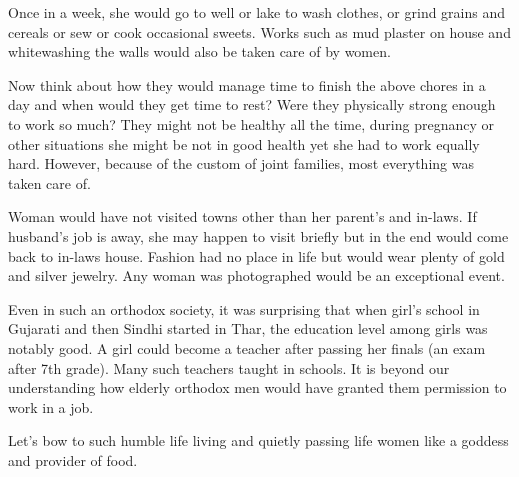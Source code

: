 Once in a week, she would go to well or lake to wash clothes, or grind grains
and cereals or sew or cook occasional sweets. Works such as mud plaster on
house and whitewashing the walls would also be taken care of by women.

Now think about how they would manage time to finish the above chores in a day
and when would they get time to rest? Were they physically strong enough to
work so much? They might not be healthy all the time, during pregnancy or other
situations she might be not in good health yet she had to work equally hard.
However, because of the custom of joint families, most everything was taken
care of.

Woman would have not visited towns other than her parent's and in-laws. If
husband's job is away, she may happen to visit briefly but in the end would
come back to in-laws house. Fashion had no place in life but would wear plenty
of gold and silver jewelry. Any woman was photographed would be an exceptional
event.

Even in such an orthodox society, it was surprising that when girl's school in
Gujarati and then Sindhi started in Thar, the education level among girls was
notably good. A girl could become a teacher after passing her finals (an exam
after 7th grade). Many such teachers taught in schools. It is beyond our
understanding how elderly orthodox men would have granted them permission to
work in a job.

Let's bow to such humble life living and quietly passing life women like a
goddess and provider of food.
